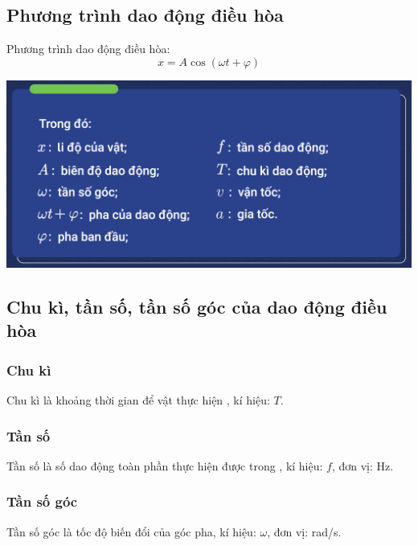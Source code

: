 \subsection{Phương trình dao động điều hòa}
Phương trình dao động điều hòa:
\begin{equation*}
	x=A\cos\left(\omega t+\varphi\right)
\end{equation*}
\begin{center}
	\includegraphics[scale=0.4]{../figs/VN12-PH-02-A-001-1-V2-1.png}
\end{center}
\subsection{Chu kì, tần số, tần số góc của dao động điều hòa}
\subsubsection{Chu kì}
Chu kì là khoảng thời gian để vật thực hiện , kí hiệu: $T$.
\subsubsection{Tần số}
Tần số là số dao động toàn phần thực hiện được trong , kí hiệu: $f$, đơn vị: Hz.
\subsubsection{Tần số góc}
Tần số góc là tốc độ biến đổi của góc pha, kí hiệu: $\omega$, đơn vị: rad/s.
